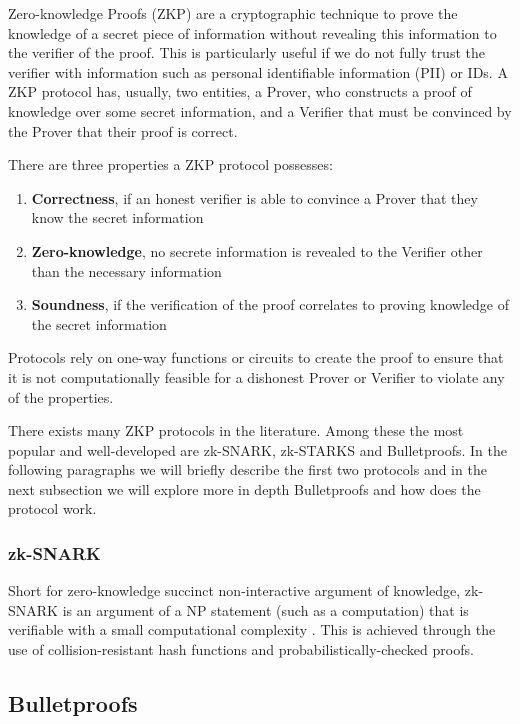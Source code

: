 \documentclass[sigconf,screen,nonacm]{acmart}
\begin{document}
  Zero-knowledge Proofs (ZKP) are a cryptographic technique to prove the knowledge of
  a secret piece of information without revealing this information to the verifier
  of the proof. This is particularly useful if we do not fully trust the verifier
  with information such as personal identifiable information (PII) or IDs.
  A ZKP protocol has, usually, two entities, a Prover, who constructs a proof of knowledge
  over some secret information, and a Verifier that must be convinced by the Prover
  that their proof is correct.

  There are three properties a ZKP protocol possesses:
  \begin{enumerate}
    \item \textbf{Correctness}, if an honest verifier is able to convince a Prover
      that they know the secret information \cite{Gibson22}
    \item \textbf{Zero-knowledge}, no secrete information is revealed to the Verifier
      other than the necessary information \cite{Gibson22}
    \item \textbf{Soundness}, if the verification of the proof correlates to proving
      knowledge of the secret information \cite{Gibson22}
  \end{enumerate}
  Protocols rely on one-way functions or circuits to create the proof to ensure that
  it is not computationally feasible for a dishonest Prover or Verifier to violate
  any of the properties.

  There exists many ZKP protocols in the literature. Among these the most popular and
  well-developed are zk-SNARK, zk-STARKS and Bulletproofs. In the following paragraphs
  we will briefly describe the first two protocols and in the next subsection
  we will explore more in depth Bulletproofs and how does the protocol work.

  \subsubsection{zk-SNARK}

  Short for zero-knowledge succinct non-interactive argument of knowledge, zk-SNARK
  is an argument of a NP statement (such as a computation) that is verifiable with
  a small computational complexity \cite{cryptoeprint:2012/095}. This is achieved
  through the use of collision-resistant hash functions and probabilistically-checked
  proofs\cite{cryptoeprint:2012/095}.

  \subsection{Bulletproofs}
\end{document}
